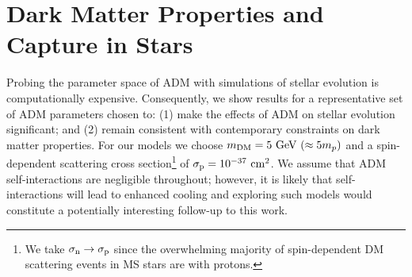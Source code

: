 \documentclass[useAMS,usenatbib]{mnras}
\begin{document}
%


\section{Dark Matter Properties and Capture in Stars}
\label{sec:props}


  Probing the parameter space of ADM with simulations of stellar evolution is computationally expensive. Consequently, we show results for a representative set of ADM parameters chosen to: (1) make the effects of ADM on stellar evolution significant; and (2) remain consistent with contemporary constraints on dark matter properties. For our models we choose $m_{\mathrm{DM}} = 5 \ \mathrm{GeV}\ (\approx 5m_p)$ and a spin-dependent scattering cross section\footnote{We take $\sigma_{\mathrm{n}} \rightarrow \sigma_{\mathrm{p}}$ since the overwhelming majority of spin-dependent DM scattering events in MS stars are with protons.} of $\sigma_{\mathrm{p}} = 10^{-37} \ \mathrm{cm}^2$. We assume that ADM self-interactions are negligible throughout; however, it is likely that self-interactions will lead to enhanced cooling \citep[e.g.,][]{Zentner2009High-energySun} and exploring such models would constitute a potentially interesting follow-up to this work.

\end{document}
